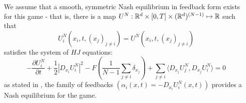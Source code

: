 We assume that a smooth, symmetric Nash equilibrium in feedback form exists for
this game - that is, there is a map
$U^N : \mathbb{R}^d \times [0,T] \times (\mathbb{R}^d)^{(N-1)} \mapsto \mathbb{R}$ such that
\begin{equation}
    U^N_i(x_i, t, (x_j)_{j\neq i}) = U^N(x_i, t, (x_j)_{j\neq i})
\end{equation}
satisfies the system of $HJ$ equations:
\begin{equation}
    -\frac{\partial U_i^N}{\partial t} + \frac{1}{2}|D_{x_i} U_i^N|^2 - F\left( \frac{1}{N-1}  \sum_{j\neq i} \delta_{x_j} \right) + \sum_{j \neq i} \langle D_{x_j} U^N_j, D_{x_j} U^N_i \rangle = 0
\end{equation}
as stated in \cite{Cardaliaget}, the family of feedbacks $(\alpha_i(x,t) = - D_{x_i} U^N_i (x,t))$
provides a Nash equilibrium for the game.

